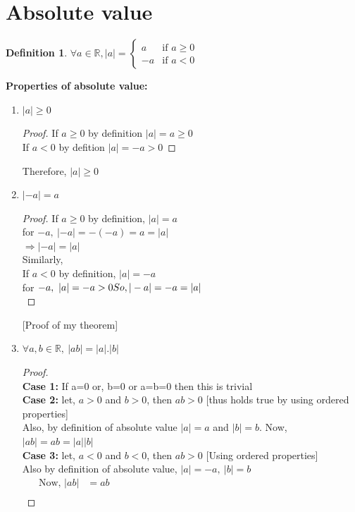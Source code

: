 \documentclass{article}
\newtheorem{definition}{Definition}[section]
\newcommand{\Rw}{\Rightarrow}
\newcommand{\hs}{\hspace}
\begin{document}
\section{Absolute value}
\begin{definition}
    $\forall a \in \mathbb{R}, |a|=
\begin{cases}
    a   & \text{if }a\geq 0\\
    -a&\text{if }a<0
\end{cases}$
\end{definition}
\textbf{Properties of absolute value:}
\begin{enumerate}
    \item $|a|\geq 0$
    \begin{proof}
        If $a\geq 0$ by definition $|a|=a\geq0 $ \\
        If $a < 0$ by defition $|a|=-a>0$
    \end{proof}
    Therefore, $|a|\geq 0$
    \item $|-a|=a$
    \begin{proof}
        If $a\geq 0$ by definition, $|a|=a$\\
        for $-a,\ |-a|=-(-a)=a=|a|$\\
        $\Rw |-a|=|a|$\\
        Similarly,\\
        If $a< 0$ by definition, $|a|=-a$\\
        for $-a,\ |a|=-a >0\\
        So,|-a|=-a=|a|$\\
    \end{proof}[Proof of my theorem]
    \item $\forall a,b \in \mathbb{R},\ |ab|=|a|.|b|$
    \begin{proof}$ $\\
        \textbf{Case 1: } If a=0 or, b=0 or a=b=0 then this is trivial\\
        \textbf{Case 2: } let, $a>0$ and $b>0$, then $ab>0$ [thus holds true by using ordered properties]\\
        Also, by definition of absolute value $|a|=a$ and $|b|=b$. Now, $|ab|=ab=|a||b|$\\
        \textbf{Case 3: } let, $a<0$ and $b<0$, then $ab>0$ [Using ordered properties]\\
        Also by definition of absolute value, $|a|=-a,\ |b|=b $\\
        \begin{align*}
            \text{Now, } |ab|&=ab \hs{10cm}\\

\end{align*}
\end{proof}
\end{enumerate}
\end{document}
